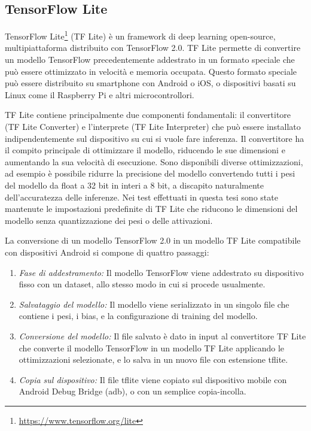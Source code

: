 \documentclass[12pt,italian]{report}
\begin{document}
\subsection{TensorFlow Lite}
TensorFlow Lite\footnote{\url{https://www.tensorflow.org/lite}} (TF Lite) è un framework di deep learning open-source, multipiattaforma distribuito con TensorFlow 2.0. TF Lite permette di convertire un modello TensorFlow precedentemente addestrato in un formato speciale che può essere ottimizzato in velocità e memoria occupata. Questo formato speciale può essere distribuito su smartphone con Android o iOS, o dispositivi basati su Linux come il Raspberry Pi e altri microcontrollori.

TF Lite contiene principalmente due componenti fondamentali:  il convertitore (TF Lite Converter) e l'interprete (TF Lite Interpreter) che può essere installato indipendentemente sul dispositivo su cui si vuole fare inferenza.  Il convertitore ha il compito principale di ottimizzare il modello, riducendo le sue dimensioni e aumentando la sua velocità di esecuzione. Sono disponibili diverse ottimizzazioni, ad esempio è possibile ridurre la precisione del modello convertendo tutti i pesi del modello da float a 32 bit in interi a 8 bit, a discapito naturalmente dell'accuratezza delle inferenze. Nei test effettuati in questa tesi sono state mantenute le impostazioni predefinite di TF Lite che riducono le dimensioni del modello senza quantizzazione dei pesi o delle attivazioni.

La conversione di un modello TensorFlow 2.0 in un modello TF Lite compatibile con dispositivi Android si compone di quattro passaggi:
\begin{enumerate}
\item \textit{Fase di addestramento:} Il modello TensorFlow viene addestrato su dispositivo fisso con un dataset, allo stesso modo in cui si procede usualmente.

\item \textit{Salvataggio del modello:} Il modello viene serializzato in un singolo file che contiene i pesi, i bias, e la configurazione di training del modello.

\item \textit{Conversione del modello:} Il file salvato è dato in input al convertitore TF Lite che converte il modello TensorFlow in un modello TF Lite applicando le ottimizzazioni selezionate, e lo salva in un nuovo file con estensione tflite.

\item \textit{Copia sul dispositivo:} Il file tflite viene copiato sul dispositivo mobile con  Android Debug Bridge (adb), o con un semplice copia-incolla.
\end{enumerate}
\end{document}
